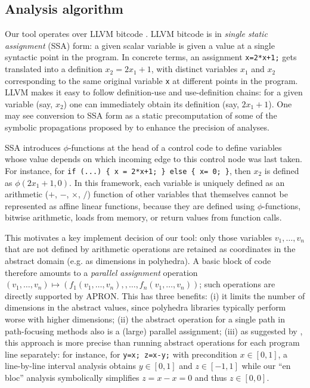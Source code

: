 \documentclass[preprint]{sigplanconf}
\begin{document}
\subsection{Analysis algorithm}
\label{sec:analysis-algorithm}
Our tool operates over LLVM bitcode \citep{LLVM_langref,Lattner:2004:LCF:977395.977673}. LLVM bitcode is in \emph{single static assignment} (SSA) form: a given scalar variable is given a value at a single syntactic point in the program. In concrete terms, an assignment \lstinline|x=2*x+1;| gets translated into a definition $x_2 = 2x_1+1$, with distinct variables $x_1$ and $x_2$ corresponding to the same original variable \lstinline|x| at different points in the program.
LLVM makes it easy to follow definition-use and use-definition chains: for a given variable (say, $x_2$) one can immediately obtain its definition (say, $2x_1+1$).
One may see conversion to SSA form as a static precomputation of some of the symbolic propagations proposed by \citet{DBLP:conf/vmcai/Mine06} to enhance the precision of analyses.

SSA introduces $\phi$-functions at the head of a control code to define variables whose value depends on which incoming edge to this control node was last taken. For instance, for \lstinline|if (...) { x = 2*x+1; } else { x= 0; }|, then $x_2$ is defined as $\phi(2x_1+1,0)$. In this framework, each variable is uniquely defined as an arithmetic ($+$, $-$, $\times$, $/$) function of other variables that themselves cannot be represented as affine linear functions, because they are defined using $\phi$-functions, bitwise arithmetic, loads from memory, or return values from function calls.

This motivates a key implement decision of our tool: only those variables $v_1,\dots,v_n$ that are not defined by arithmetic operations are retained as coordinates in the abstract domain (e.g. as dimensions in polyhedra). A basic block of code therefore amounts to a \emph{parallel assignment} operation
$(v_1,\dots,v_n) \allowbreak\mapsto\allowbreak
(f_1(v_1,\dots,v_n), \allowbreak, \dots, \allowbreak
 f_n(v_1,\dots,v_n))$;
such operations are directly supported by APRON. This has three benefits:
(i) it limits the number of dimensions in the abstract values, since polyhedra libraries typically perform worse with higher dimensions;
(ii) the abstract operation for a single path in path-focusing methods also is a (large) parallel assignment;
(iii) as suggested by \citet{DBLP:conf/vmcai/Mine06}, this approach is more precise than running abstract operations for each program line separately:
for instance, for \lstinline|y=x; z=x-y;| with precondition $x \in [0,1]$, a line-by-line interval analysis obtains $y \in [0,1]$ and $z \in [-1,1]$ while our ``en bloc'' analysis symbolically simplifies $z = x - x = 0$ and thus $z \in [0,0]$.
\end{document}
